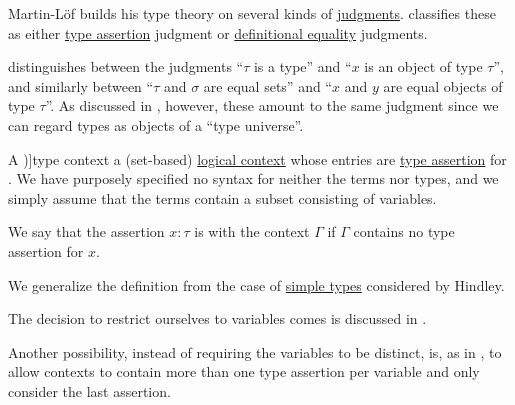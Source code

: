 \begin{remark}\label{rem:typing_judgments}
  Martin-L\"of builds his type theory on several kinds of \hyperref[con:judgment]{judgments}. \cite[19]{UnivalentProject2024OctoberHoTT} classifies these as either \hyperref[def:type_assertion]{type assertion} judgment or \hyperref[con:definitional_equality]{definitional equality} judgments.

   distinguishes between the judgments \enquote{\( \tau \) is a type} and \enquote{\( x \) is an object of type \( \tau \)}, and similarly between \enquote{\( \tau \) and \( \sigma \) are equal sets} and \enquote{\( x \) and \( y \) are equal objects of type \( \tau \)}. As discussed in , however, these amount to the same judgment since we can regard types as objects of a \enquote{type universe}.
\end{remark}

\begin{definition}\label{def:type_context}
  A \term[en=type-context (\cite[def. 2A5]{Hindley1997BasicSTT})]{type context} a (set-based) \hyperref[def:logical_context]{logical context} whose entries are \hyperref[def:type_assertion]{type assertion} for . We have purposely specified no syntax for neither the terms nor types, and we simply assume that the terms contain a subset consisting of variables.

  We say that the assertion \( x: \tau \) is  with the context \( \Gamma \) if \( \Gamma \) contains no type assertion for \( x \).
\end{definition}
\begin{comments}
  \item We generalize the definition from the case of \hyperref[def:simple_type]{simple types} considered by Hindley.

  \item The decision to restrict ourselves to variables comes is discussed in .

  \item Another possibility, instead of requiring the variables to be distinct, is, as in \cite[159]{Mimram2020ProgramEqualsProof}, to allow contexts to contain more than one type assertion per variable and only consider the last assertion.
\end{comments}

